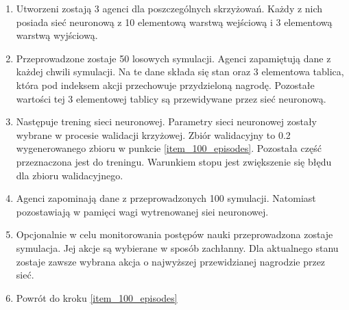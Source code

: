\documentclass[12pt]{book}
\theoremstyle{plain}
\begin{document}
\begin{enumerate}
	\item 
	Utworzeni zostają 3 agenci dla poszczególnych skrzyżowań. Każdy z nich posiada sieć
	neuronową z 10 elementową warstwą wejściową i 3 elementową warstwą wyjściową.
	\item Przeprowadzone zostaje 50 losowych symulacji. Agenci zapamiętują dane z każdej chwili symulacji. Na te dane składa się stan oraz 3 elementowa tablica, która pod indeksem akcji przechowuje przydzieloną nagrodę. Pozostałe wartości tej 3 elementowej tablicy są przewidywane przez sieć neuronową. \label{item_100_episodes}
	\item Następuje trening sieci neuronowej. Parametry sieci neuronowej zostały wybrane w procesie walidacji krzyżowej. Zbiór walidacyjny to 0.2 wygenerowanego zbioru w punkcie \ref{item_100_episodes}. Pozostała część przeznaczona jest do treningu. Warunkiem stopu jest zwiększenie się błędu dla zbioru walidacyjnego.
	\item Agenci zapominają dane z przeprowadzonych 100 symulacji. Natomiast pozostawiają w pamięci wagi wytrenowanej siei neuronowej.
	\item Opcjonalnie w celu monitorowania postępów nauki przeprowadzona zostaje symulacja. Jej akcje są wybierane w sposób zachłanny. Dla aktualnego stanu zostaje zawsze wybrana akcja o najwyższej przewidzianej nagrodzie przez sieć.
	\item Powrót do kroku \ref{item_100_episodes}
\end{enumerate}
\end{document}
